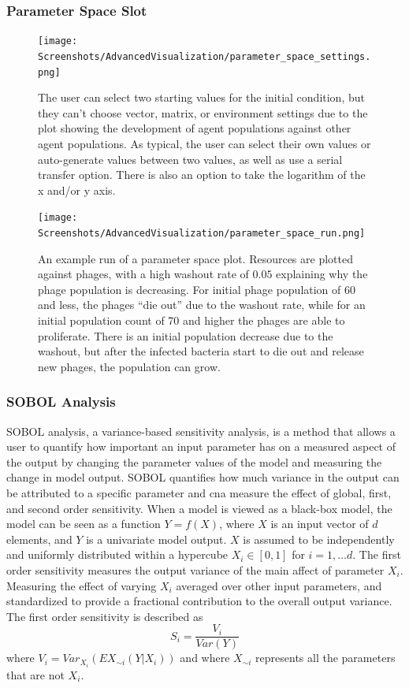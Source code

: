 \subsubsection{Parameter Space Slot}
\begin{figure}
    \centering 
    \texttt{[image: Screenshots/AdvancedVisualization/parameter\_space\_settings.png]}
    \caption{
        The user can select two starting values for the initial condition, but they can't choose vector, matrix, or environment settings due to the plot showing the development of agent populations against other agent populations. 
        As typical, the user can select their own values or auto-generate values between two values, as well as use a serial transfer option. 
        There is also an option to take the logarithm of the x and/or y axis. 
    }
    \label{fig:ss:av:phase_portrait_settings}
\end{figure}
\begin{figure}
    \centering 
    \texttt{[image: Screenshots/AdvancedVisualization/parameter\_space\_run.png]}
    \caption{
        An example run of a parameter space plot. 
        Resources are plotted against phages, with a high washout rate of $0.05$ explaining why the phage population is decreasing. 
        For initial phage population of 60 and less, the phages “die out” due to the washout rate, while for an initial population count of 70 and higher the phages are able to proliferate. 
        There is an initial population decrease due to the washout, but after the infected bacteria start to die out and release new phages, the population can grow. 
    }
    \label{fig:ss:av:phase_portrait_run}
\end{figure}

\subsubsection{SOBOL Analysis}
SOBOL analysis, a variance-based sensitivity analysis, is a method that allows a user to quantify how important an input parameter has on a measured aspect of the output by changing the parameter values of the model and measuring the change in model output. 
SOBOL quantifies how much variance in the output can be attributed to a specific parameter and cna measure the effect of global, first, and second order sensitivity.  
When a model is viewed as a black-box model, the model can be seen as a function $Y=f(X)$, where $X$ is an input vector of $d$ elements, and $Y$ is a univariate model output. 
$X$ is assumed to be independently and uniformly distributed within a hypercube $X_i \in [0, 1]$ for $i=1, \dots d$. 
The first order sensitivity measures the output variance of the main affect of parameter $X_i$. 
Measuring the effect of varying $X_i$ averaged over other input parameters, and standardized to provide a fractional contribution to the overall output variance. 
The first order sensitivity is described as 
\[
    S_i = \frac{V_i}{Var(Y)}
\] where $V_i = Var_{X_i}(E{X_{\sim i}}(Y|X_i))$ and where $X_{\sim i}$ represents all the parameters that are not $X_i$. 
\newline

